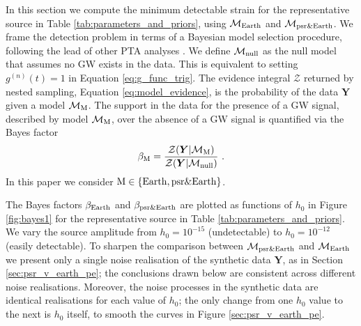 \documentclass[fleqn,usenatbib,useAMS]{mnras}
\begin{document}
In this section we compute the minimum detectable strain for the representative source in Table \ref{tab:parameters_and_priors}, using $\mathcal{M}_{\rm Earth}$ and $\mathcal{M}_{\rm psr \& Earth}$. We frame the detection problem in terms of a Bayesian model selection procedure, following the lead of other PTA analyses \citep[e.g.][]{2023ApJ...951L...8A,2023arXiv230616214A,2023ApJ...951L...6R,2023RAA....23g5024X}. We define $\mathcal{M}_{\rm null}$ as the null model that assumes no GW exists in the data. This is equivalent to setting $g^{(n)}(t)=1$ in Equation \eqref{eq:g_func_trig}. The evidence integral $\mathcal{Z}$ returned by nested sampling, Equation \eqref{eq:model_evidence}, is the probability of the data $\boldsymbol{Y}$ given a model $\mathcal{M}_{\rm M}$. The support in the data for the presence of a GW signal, described by model $\mathcal{M}_{\rm M}$, over the absence of a GW signal is quantified via the Bayes factor
		\begin{equation}
			\beta_{\rm M} = \frac{\mathcal{Z}(\boldsymbol{Y} | \mathcal{M}_{\rm M})}{\mathcal{Z}(\boldsymbol{Y} | \mathcal{M}_{\rm null})} \ . \label{eq:bayes}
		\end{equation}
In this paper we consider $\rm M \in \left \{ \rm Earth, psr \& Earth \right \}$. \newline 
	
The Bayes factors $\beta_{\rm Earth}$ and $\beta_{\rm psr{\&}Earth}$ are plotted as functions of $h_0$ in Figure \ref{fig:bayes1} for the representative source in Table \ref{tab:parameters_and_priors}. We vary the source amplitude from $h_0 = 10^{-15}$ (undetectable) to $h_0 = 10^{-12}$ (easily detectable). To sharpen the comparison between $\mathcal{M}_{\rm psr \& Earth}$ and $\mathcal{M}_{\rm Earth}$ we present only a single noise realisation of the synthetic data $\boldsymbol{Y}$, as in Section \ref{sec:psr_v_earth_pe}; the conclusions drawn below are consistent across different noise realisations. Moreover, the noise processes in the synthetic data are identical realisations for each value of $h_0$; the only change from one $h_0$ value to the next is $h_0$ itself, to smooth the curves in Figure \ref{sec:psr_v_earth_pe}. \newline 
\end{document}
